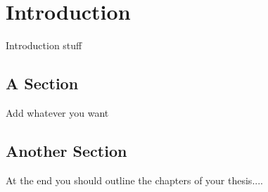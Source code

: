\chapter{Introduction} %
\label{chap:intro}

Introduction stuff

\section{A Section} %
\label{sec:ref}

Add whatever you want

\section{Another Section} %
\label{sec:ref2}

At the end you should outline the chapters of your thesis....



